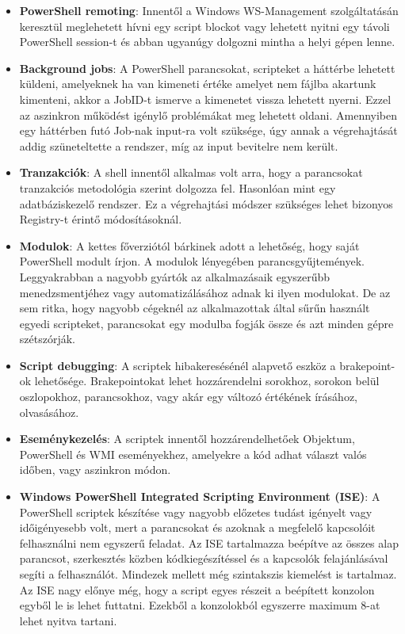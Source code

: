 \documentclass[12pt,oneside,justify,table]{book}
\begin{document}
\begin{itemize}
	\item \textbf{PowerShell remoting}: Innentől a Windows WS-Management szolgáltatásán keresztül meglehetett hívni egy script blockot vagy lehetett nyitni egy távoli PowerShell session-t és abban ugyanúgy dolgozni mintha a helyi gépen lenne.
	\item \textbf{Background jobs}: A PowerShell parancsokat, scripteket a háttérbe lehetett küldeni, amelyeknek ha van kimeneti értéke amelyet nem fájlba akartunk kimenteni, akkor a JobID-t ismerve a kimenetet vissza lehetett nyerni. Ezzel az aszinkron működést igénylő problémákat meg lehetett oldani. Amennyiben egy háttérben futó Job-nak input-ra volt szüksége, úgy annak a végrehajtását addig szüneteltette a rendszer, míg az input bevitelre nem került.
	\item \textbf{Tranzakciók}: A shell innentől alkalmas volt arra, hogy a parancsokat tranzakciós metodológia szerint dolgozza fel. Hasonlóan mint egy adatbáziskezelő rendszer. Ez a végrehajtási módszer szükséges lehet bizonyos Registry-t érintő módosításoknál.
	\item \textbf{Modulok}: A kettes főverziótól bárkinek adott a lehetőség, hogy saját PowerShell modult írjon. A modulok lényegében parancsgyűjtemények. Leggyakrabban a nagyobb gyártók az alkalmazásaik egyszerűbb menedzsmentjéhez vagy automatizálásához adnak ki ilyen modulokat. De az sem ritka, hogy nagyobb cégeknél az alkalmazottak által sűrűn használt egyedi scripteket, parancsokat egy modulba fogják össze és azt minden gépre szétszórják.
	\item \textbf{Script debugging}: A scriptek hibakeresésénél alapvető eszköz a brakepoint-ok lehetősége. Brakepointokat lehet hozzárendelni sorokhoz, sorokon belül oszlopokhoz, parancsokhoz, vagy akár egy változó értékének írásához, olvasásához.
	\item \textbf{Eseménykezelés}: A scriptek innentől hozzárendelhetőek Objektum, PowerShell és WMI eseményekhez, amelyekre a kód adhat választ valós időben, vagy aszinkron módon.
	\item \textbf{Windows PowerShell Integrated Scripting Environment (ISE)}: A PowerShell scriptek készítése vagy nagyobb előzetes tudást igényelt vagy időigényesebb volt, mert a parancsokat és azoknak a megfelelő kapcsolóit felhasználni nem egyszerű feladat. Az ISE tartalmazza beépítve az összes alap parancsot, szerkesztés közben kódkiegészítéssel és a kapcsolók felajánlásával segíti a felhasználót. Mindezek mellett még szintakszis kiemelést is tartalmaz. Az ISE nagy előnye még, hogy a script egyes részeit a beépített konzolon egyből le is lehet futtatni. Ezekből a konzolokból egyszerre maximum 8-at lehet nyitva tartani. 

\end{itemize}
\end{document}
